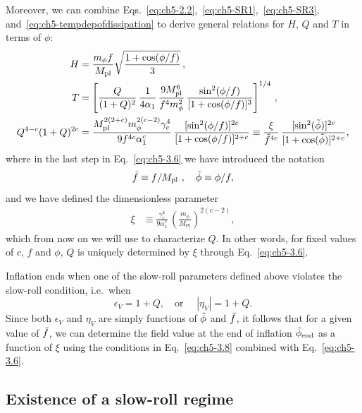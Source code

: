 Moreover, we can combine Eqs.~\ref{eq:ch5-2.2},~\ref{eq:ch5-SR1},~\ref{eq:ch5-SR3}, and~\ref{eq:ch5-tempdepofdissipation} to derive general relations for $H$, $Q$ and $T$ in terms of $\phi$:
\begin{align}
    H &= \frac{m_\phi f}{M_{\mathrm{pl}}}\sqrt{\frac{1+\cos(\phi/f)}{3}}\,, \\
    T &= \left[ \frac{Q}{(1+Q)^2}\,\frac{1}{4\alpha_1}\, \frac{9 M_{\mathrm{pl}}^6}{f^4 m_\phi^2}\,\frac{\sin^2(\phi/f)}{[1+\cos(\phi/f)]^3}\right]^{1/4}\,, \label{eq:ch5-3.5} \\
    Q^{4-c}(1+Q)^{2c} &= \frac{M_{\mathrm{pl}}^{2(2+c)}m_\phi^{2(c-2)}\gamma_c^4}{9 f^{4c} \alpha_1^c}\, \frac{[\sin^2(\phi/f)]^{2c}}{[1+\cos(\phi/f)]^{2+c}}
    \equiv \frac{\xi}{\Tilde{f}^{4c}} \, \frac{[\sin^2(\Tilde{\phi})]^{2c}}{[1+\cos(\Tilde{\phi})]^{2+c}}, \label{eq:ch5-3.6}
\end{align}
where in the last step in Eq.~\ref{eq:ch5-3.6} we have introduced the notation
\begin{equation}
\Tilde{f}\equiv f/M_{\mathrm{pl}} \,\, , \quad \Tilde{\phi}\equiv\phi/f, \label{eq:ch5-3.6.1}
\end{equation}
and we have defined the dimensionless parameter
\begin{align}
    \xi& \equiv \frac{\gamma_c^4}{9 \alpha_1^c}\,\left(\frac{m_{\phi}}{M_{\mathrm{Pl}}}\right)^{2(c-2)}, \label{eq:ch5-3.7}
\end{align}
which from now on we will use to characterize $Q$. In other words, for fixed values of $c$, $f$ and $\phi$, $Q$ is uniquely determined by $\xi$ through Eq.~\ref{eq:ch5-3.6}.

Inflation ends when one of the slow-roll parameters defined above violates the slow-roll condition, i.e.\ when
\begin{equation}
    \epsilon_V=1+Q, \quad \text{or } \quad |\eta_V|=1+Q. \label{eq:ch5-3.8}
\end{equation}
Since both $\epsilon_V$ and $\eta_V$ are simply functions of $\Tilde{\phi}$ and $\Tilde{f}$, it follows that for a given value of $\Tilde{f}$, we can determine the field value at the end of inflation $\Tilde{\phi}_{\mathrm{end}}$ as a function of $\xi$ using the conditions in Eq.~\ref{eq:ch5-3.8} combined with Eq.~\ref{eq:ch5-3.6}.

\subsection{Existence of a slow-roll regime}
\label{sec:ch5-3.1.2}

